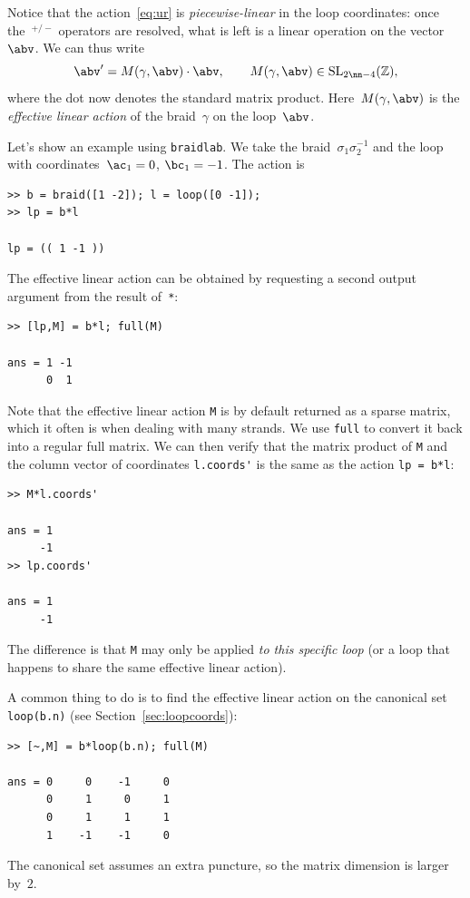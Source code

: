\documentclass[12pt]{article}
\newcommand{\braidlab}{\texttt{braidlab}}%
\newcommand{\braid}{\texttt{braid}}%
\newcommand{\loopc}{\texttt{loop}}%
\begin{document}
Notice that the action~\eqref{eq:ur} is \emph{piecewise-linear} in the loop
coordinates: once the~${}^{+/-}$ operators are resolved, what is left is a
linear operation on the vector~$\abv$.  We can thus write
\begin{equation}
  \abv' = M(\gamma,\abv)\cdot\abv,
  \qquad
  M(\gamma,\abv) \in \mathrm{SL}_{2\nn-4}(\mathbb{Z}),
\end{equation}
where the dot now denotes the standard matrix product.  Here~$M(\gamma,\abv)$
is the \emph{effective linear action} of the braid~$\gamma$ on the
loop~$\abv$.

\index{braid class@\braid\ class!action on \loopc\ (\lstinline{*})|(}%
Let's show an example using \braidlab.  We take the
braid~$\sigma_1\sigma_2^{-1}$ and the loop with coordinates~$\ac_1=0$,
$\bc_1=-1$.  The action is
\begin{lstlisting}[frame=single,framerule=0pt]
>> b = braid([1 -2]); l = loop([0 -1]);
>> lp = b*l

lp = (( 1 -1 ))
\end{lstlisting}
The effective linear action can be obtained by requesting a second output
argument from the result of~\lstinline{*}:
\begin{lstlisting}[frame=single,framerule=0pt]
>> [lp,M] = b*l; full(M)

ans = 1 -1
      0  1
\end{lstlisting}
Note that the effective linear action \lstinline{M} is by default returned as
a sparse matrix, %
%
which it often is when dealing with many strands.  We use \lstinline{full} %
%
to convert it back into a regular full matrix.  We can then verify that the
matrix product of \lstinline{M} and the column vector of coordinates
\lstinline{l.coords'} is the same as the action \lstinline{lp = b*l}:
\begin{lstlisting}[frame=single,framerule=0pt]
>> M*l.coords'

ans = 1
     -1
>> lp.coords'

ans = 1
     -1
\end{lstlisting}
The difference is that \lstinline{M} may only be applied \emph{to this
  specific loop} (or a loop that happens to share the same effective linear
action).

A common thing to do is to find the effective linear action on the canonical
set \lstinline{loop(b.n)} (see Section~\ref{sec:loopcoords}):
\begin{lstlisting}[frame=single,framerule=0pt]
>> [~,M] = b*loop(b.n); full(M)

ans = 0     0    -1     0
      0     1     0     1
      0     1     1     1
      1    -1    -1     0
\end{lstlisting}
The canonical set assumes an extra puncture, so the matrix dimension is larger
by~$2$.
\end{document}
